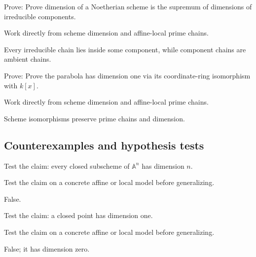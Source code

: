 \begin{exercise}\label{exr:vi30-expand-08}
Prove: Prove dimension of a Noetherian scheme is the supremum of dimensions of irreducible components.
\end{exercise}
\begin{hint}
Work directly from scheme dimension and affine-local prime chains.
\end{hint}
\begin{solution}
Every irreducible chain lies inside some component, while component chains are ambient chains.
\end{solution}

\begin{exercise}[Parabola]\label{exr:vi30-expand-09}
Prove: Prove the parabola has dimension one via its coordinate-ring isomorphism with $k[x]$.
\end{exercise}
\begin{hint}
Work directly from scheme dimension and affine-local prime chains.
\end{hint}
\begin{solution}
Scheme isomorphisms preserve prime chains and dimension.
\end{solution}

\subsection*{Counterexamples and hypothesis tests}

\begin{exercise}\label{exr:vi30-expand-10}
Test the claim: every closed subscheme of $\mathbb A^n$ has dimension $n$.
\end{exercise}
\begin{hint}
Test the claim on a concrete affine or local model before generalizing.
\end{hint}
\begin{solution}
False.
\end{solution}

\begin{exercise}\label{exr:vi30-expand-11}
Test the claim: a closed point has dimension one.
\end{exercise}
\begin{hint}
Test the claim on a concrete affine or local model before generalizing.
\end{hint}
\begin{solution}
False; it has dimension zero.
\end{solution}

